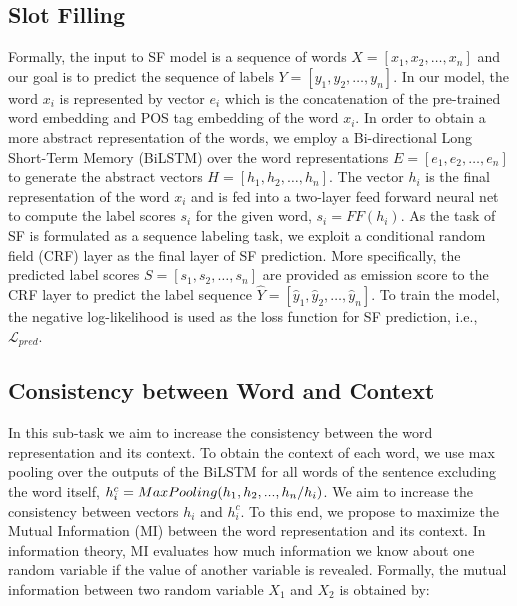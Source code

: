 \documentclass[11pt,a4paper]{article}
\begin{document}
\subsection{Slot Filling}
Formally, the input to SF model is a sequence of words $X=[x_1,x_2,\ldots,x_n]$ and our goal is to predict the sequence of labels $Y=[y_1,y_2,\ldots,y_n]$. In our model, the word $x_i$ is represented by vector $e_i$ which is the concatenation of the pre-trained word embedding and POS tag embedding of the word $x_i$. In order to obtain a more abstract representation of the words, we employ a Bi-directional Long Short-Term Memory (BiLSTM) over the word representations $E=[e_1,e_2,\ldots,e_n]$ to generate the abstract vectors $H=[h_1,h_2,\ldots,h_n]$. The vector $h_i$ is the final representation of the word $x_i$ and is fed into a two-layer feed forward neural net to compute the label scores $s_i$ for the given word, $s_i = FF(h_i)$. As the task of SF is formulated as a sequence labeling task, we exploit a conditional random field (CRF) layer as the final layer of SF prediction. More specifically, the predicted label scores $S=[s_1,s_2,\ldots,s_n]$ are provided as emission score to the CRF layer to predict the label sequence $\hat{Y}=[\hat{y}_1,\hat{y}_2,\ldots,\hat{y}_n]$. 
To train the model, the negative log-likelihood is used as the loss function for SF prediction, i.e., $\mathcal{L}_{pred}$. 















\subsection{Consistency between Word and Context}
In this sub-task we aim to increase the consistency between the word representation and its context. To obtain the context of each word, we use max pooling over the outputs of the BiLSTM for all words of the sentence excluding the word itself, $ h^c_i = Max\-Pooling({h_1,h_2,...,h_n}/h_i)$. We aim to increase the consistency between vectors $h_i$ and $h^c_i$. To this end, we propose to maximize the Mutual Information (MI) between the word representation and its context. In information theory, MI evaluates how much information we know about one random variable if the value of another variable is revealed. Formally, the mutual information between two random variable $X_1$ and $X_2$ is obtained by:
\end{document}
